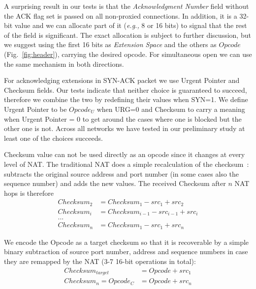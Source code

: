 \documentclass{sig-alternate-10pt}
\providecommand{\eg}{\emph{e.g.,} }
\begin{document}
A surprising result in our tests is that the \emph{Acknowledgment Number} field without the ACK flag set is passed on all non-proxied connections. In addition, it is a 32-bit value and we can allocate part of it (\eg 8 or 16 bits) to signal that the rest of the field is significant. The exact allocation is subject to further discussion, but we suggest using the first 16 bits as \emph{Extension Space} and the others as $Opcode$ (Fig.~\ref{fig:header}), carrying the desired opcode. For simultaneous open we can use the same mechanism in both directions.

For acknowledging extensions in SYN-ACK packet we use Urgent Pointer and Checksum fields. Our tests indicate that neither choice is guaranteed to succeed, therefore we combine the two by redefining their values when SYN=1. We define Urgent Pointer to be $Opcode_U$ when URG=0 and Checksum to carry a meaning when Urgent Pointer = 0 to get around the cases where one is blocked but the other one is not. Across all networks we have tested in our preliminary study at least one of the choices succeeds.

Checksum value can not be used directly as an opcode since it changes at every level of NAT. The traditional NAT does a simple recalculation of the checksum~\cite{Egevang:tu}: subtracts the original source address and port number (in some cases also the sequence number) and adds the new values. The received Checksum after \(n\) NAT hops is therefore
\vspace{-2mm}
\begin{align*}
Checksum_2 & = Checksum_1 - src_1 + src_2 \\
Checksum_i & = Checksum_{i-1} - src_{i-1} + src_i \\
 ... \\
Checksum_n & = Checksum_1 - src_1 + src_n
\end{align*}
\vspace{-2mm}

We encode the Opcode as a target checksum so that it is recoverable by a simple binary subtraction of source port number, address and sequence numbers in case they are remapped by the NAT (3-7 16-bit operations in total): 
\vspace{-2mm}
\begin{align*}
Checksum_{target} & = Opcode + src_1 \\
Checksum_n = Opcode_C & = Opcode + src_n
\end{align*}
\vspace{-2mm}
\end{document}
